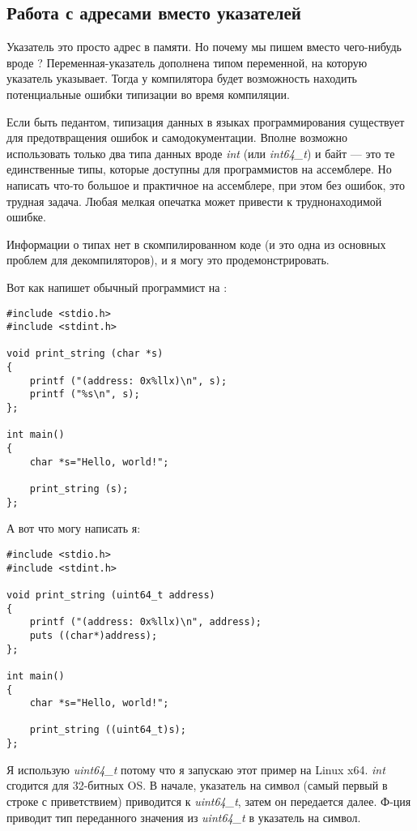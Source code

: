 \subsection{Работа с адресами вместо указателей}

Указатель это просто адрес в памяти. Но почему мы пишем  вместо чего-нибудь вроде ?
Переменная-указатель дополнена типом переменной, на которую указатель указывает.
Тогда у компилятора будет возможность находить потенциальные ошибки типизации во время компиляции.

Если быть педантом, типизация данных в языках программирования существует для предотвращения ошибок и самодокументации.
Вполне возможно использовать только два типа данных вроде \emph{int} (или \emph{int64\_t}) и байт --- это те единственные типы, которые
доступны для программистов на ассемблере.
Но написать что-то большое и практичное на ассемблере, при этом без ошибок, это трудная задача.
Любая мелкая опечатка может привести к труднонаходимой ошибке.

Информации о типах нет в скомпилированном коде (и это одна из основных проблем для декомпиляторов),
и я могу это продемонстрировать.

Вот как напишет обычный программист на \CCpp{}:

\begin{lstlisting}[style=customc]
#include <stdio.h>
#include <stdint.h>

void print_string (char *s)
{
	printf ("(address: 0x%llx)\n", s);
	printf ("%s\n", s);
};

int main()
{
	char *s="Hello, world!";

	print_string (s);
};
\end{lstlisting}

А вот что могу написать я:

\begin{lstlisting}[style=customc]
#include <stdio.h>
#include <stdint.h>

void print_string (uint64_t address)
{
	printf ("(address: 0x%llx)\n", address);
	puts ((char*)address);
};

int main()
{
	char *s="Hello, world!";

	print_string ((uint64_t)s);
};
\end{lstlisting}

Я использую \emph{uint64\_t} потому что я запускаю этот пример на Linux x64. \emph{int} сгодится для 32-битных \ac{OS}.
В начале, указатель на символ (самый первый в строке с приветствием) приводится к \emph{uint64\_t}, затем он передается далее.
Ф-ция  приводит тип переданного значения из \emph{uint64\_t} в указатель на символ.

